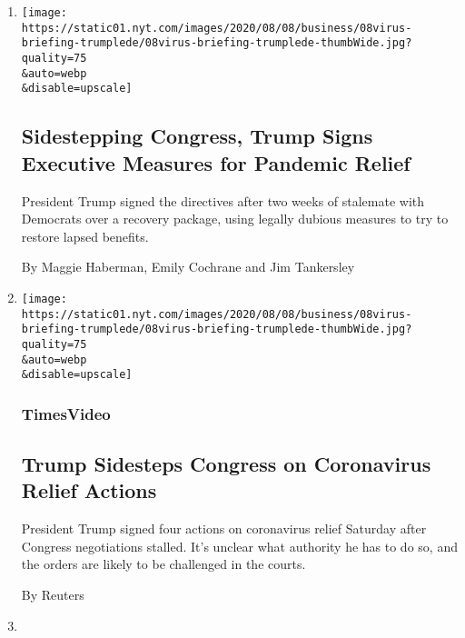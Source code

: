 \begin{enumerate}
\def\labelenumi{\arabic{enumi}.}
\item
  \href{/2020/08/08/us/politics/trump-stimulus-bill-coronavirus.html}{}

  \texttt{[image: https://static01.nyt.com/images/2020/08/08/business/08virus-briefing-trumplede/08virus-briefing-trumplede-thumbWide.jpg?quality=75\\\&auto=webp\\\&disable=upscale]}

  \hypertarget{sidestepping-congress-trump-signs-executive-measures-for-pandemic-relief}{%
  \subsection{Sidestepping Congress, Trump Signs Executive Measures for
  Pandemic
  Relief}\label{sidestepping-congress-trump-signs-executive-measures-for-pandemic-relief}}

  President Trump signed the directives after two weeks of stalemate
  with Democrats over a recovery package, using legally dubious measures
  to try to restore lapsed benefits.

  By Maggie Haberman, Emily Cochrane and Jim Tankersley
\item
  \href{/video/us/politics/100000007279838/trump-coronavirus-relief-order.html}{}

  \texttt{[image: https://static01.nyt.com/images/2020/08/08/business/08virus-briefing-trumplede/08virus-briefing-trumplede-thumbWide.jpg?quality=75\\\&auto=webp\\\&disable=upscale]}

  \hypertarget{timesvideo}{%
  \subsubsection{TimesVideo}\label{timesvideo}}

  \hypertarget{trump-sidesteps-congress-on-coronavirus-relief-actions}{%
  \subsection{Trump Sidesteps Congress on Coronavirus Relief
  Actions}\label{trump-sidesteps-congress-on-coronavirus-relief-actions}}

  President Trump signed four actions on coronavirus relief Saturday
  after Congress negotiations stalled. It's unclear what authority he
  has to do so, and the orders are likely to be challenged in the
  courts.

  By Reuters
\item
  \href{/2020/08/08/sports/ncaafootball/coronavirus-pac-12-players-larry-scott.html}{}


\end{enumerate}
